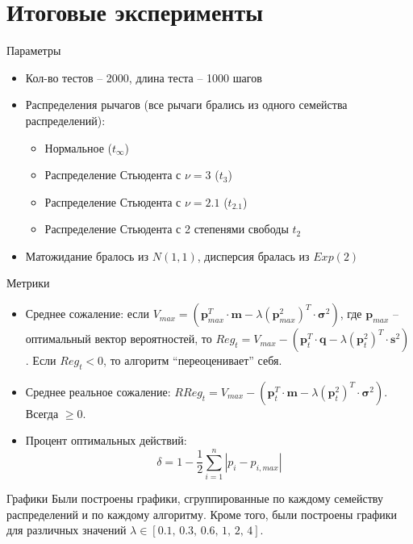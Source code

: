 \documentclass[11pt]{beamer} %
\begin{document}
\section{Итоговые эксперименты}
    \begin{frame}{Параметры}
        \begin{itemize}
            \item<1-> Кол-во тестов -- 2000, длина теста -- 1000 шагов
            \item<2-> Распределения рычагов (все рычаги брались из одного семейства распределений):
            \begin{itemize}
                \item Нормальное ($t_{\infty}$)
                \item Распределение Стьюдента с $\nu = 3$ ($t_3$) 
                \item Распределение Стьюдента с $\nu = 2.1$ ($t_{2.1}$)
                \item Распределение Стьюдента с 2 степенями свободы $t_2$
            \end{itemize}
            \item<3-> Матожидание бралось из $N(1,1)$, дисперсия бралась из $Exp(2)$
        \end{itemize}
    \end{frame}
    \begin{frame}{Метрики}
        \begin{itemize}
            \item <1-> Среднее сожаление: если $V_{max} = (\textbf{p}_{max}^T \cdot \textbf{m} - \lambda (\textbf{p}_{max}^2)^T \cdot \boldsymbol{\sigma}^2)$, где $\textbf{p}_{max}$ -- оптимальный вектор вероятностей, то $Reg_t = V_{max} - (\textbf{p}_t^T \cdot \textbf{q} - \lambda (\textbf{p}_{t}^2)^T \cdot \textbf{s}^2)$. Если $Reg_t < 0$, то алгоритм ``переоценивает'' себя.
            \item <2-> Среднее реальное сожаление: $RReg_t = V_{max} - (\textbf{p}_t^T \cdot \textbf{m} - \lambda (\textbf{p}_{t}^2)^T \cdot \boldsymbol{\sigma}^2)$. Всегда $\geq 0$.
            \item <3-> Процент оптимальных действий: $$\delta = 1 - \frac{1}{2}\sum_{i=1}^n |p_i - p_{i, max}|$$
        \end{itemize}
    \end{frame}
    \begin{frame}{Графики}
        Были построены графики, сгруппированные по каждому семейству распределений и по каждому алгоритму. Кроме того, были построены графики для различных значений $\lambda \in [0.1,\, 0.3,\, 0.6,\, 1,\, 2,\, 4]$.
    \end{frame}
\end{document}

